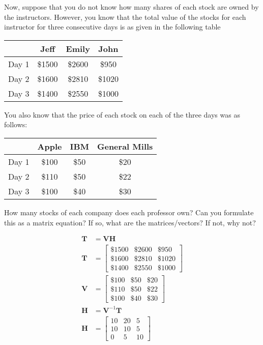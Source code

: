 Now, suppose that you do not know how many shares of each stock are owned by the instructors. However, you know that the total value of the stocks for each instructor for three consecutive days is as given in the following table

\begin{center}
    \begin{tabular}{| c | c c c|} 
        \hline
        & Jeff & Emily & John \\ 
        \hline
        Day 1 & \$1500 & \$2600 &  \$950 \\ 
        Day 2 & \$1600 & \$2810 & \$1020 \\
        Day 3 & \$1400 & \$2550 & \$1000 \\
        \hline
    \end{tabular}
\end{center}

You also know that the price of each stock on each of the three days was as follows:

\begin{center}
    \begin{tabular}{| c | c c c|} 
        \hline
        & Apple & IBM & General Mills \\
        \hline
        Day 1 & \$100 & \$50 & \$20 \\ 
        Day 2 & \$110 & \$50 & \$22 \\
        Day 3 & \$100 & \$40 & \$30 \\
        \hline
    \end{tabular}
\end{center}

How many stocks of each company does each professor own? Can you formulate this as a matrix equation? If so, what are the matrices/vectors? If not, why not?

\begin{solution}
    \begin{align*}
        \boldsymbol{T} &= \boldsymbol{VH} \\
        \boldsymbol{T} &= \begin{bmatrix}
            \$1500 & \$2600 &  \$950 \\ 
            \$1600 & \$2810 & \$1020 \\
            \$1400 & \$2550 & \$1000
        \end{bmatrix} \\
        \boldsymbol{V} &= \begin{bmatrix}
            \$100 & \$50 & \$20 \\ 
            \$110 & \$50 & \$22 \\
            \$100 & \$40 & \$30
        \end{bmatrix} \\
        \boldsymbol{H} &= \boldsymbol{V}^{-1}\boldsymbol{T} \\
        \boldsymbol{H} &= \begin{bmatrix}
            10 & 20 &  5 \\
            10 & 10 &  5 \\
             0 &  5 & 10
        \end{bmatrix}
    \end{align*}
\end{solution}
